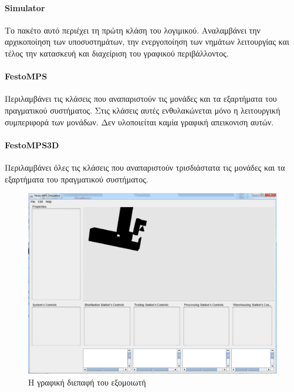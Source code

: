 \documentclass[a4paper,12pt,twoside]{report}
\begin{document}
\begin{appendices}
			\paragraph{Simulator} {Το πακέτο αυτό περιέχει τη πρώτη κλάση του λογιμικού. Αναλαμβάνει την αρχικοποίηση των υποσυστημάτων, την ενεργοποίηση των νημάτων λειτουργίας και τέλος την κατασκευή και διαχείριση του γραφικού περιβάλλοντος.
			}
			
			\paragraph{FestoMPS} {Περιλαμβάνει τις κλάσεις που αναπαριστούν τις μονάδες και τα εξαρτήματα του πραγματικού συστήματος. Στις κλάσεις αυτές ενθυλακώνεται μόνο η λειτουργική συμπεριφορά των μονάδων. Δεν υλοποιείται καμία γραφική απεικονιση αυτών.
			}
			
			\paragraph{FestoMPS3D} {Περιλαμβάνει όλες τις κλάσεις που αναπαριστούν τρισδιάστατα τις μονάδες και τα εξαρτήματα του πραγματικού συστήματος.
			}
			
			\begin{figure}[hp]
					\centering
					\includegraphics[scale=0.30]{FestoMPSSimulator.png}
					\caption{Η γραφική διεπαφή του εξομοιωτή}
					\label{φωτ:Η γραφική διεπαφή του εξομοιωτή}
				\end{figure}	
		


\end{appendices}
\end{document}
